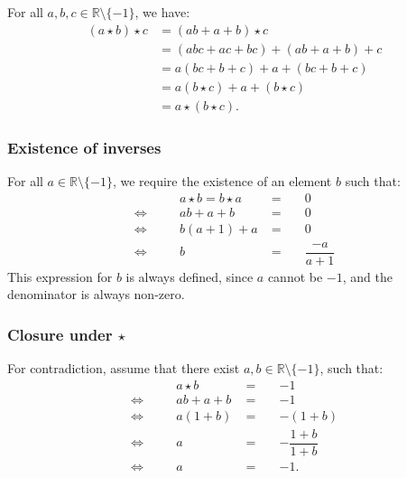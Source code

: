 \documentclass[11pt]{article}
\newcommand{\R}{\mathbb{R}}
\theoremstyle{definition}
\theoremstyle{plain}
\theoremstyle{remark}
\begin{document}
\begin{enumerate}
          For all $a, b, c \in \R \setminus \{-1\}$, we have:
          \[
              \begin{aligned}
                  (a \star b) \star c & = (ab + a + b) \star c               \\
                                      & = (abc + ac + bc) + (ab + a + b) + c \\
                                      & = a (bc + b + c) + a + (bc + b + c)  \\
                                      & = a (b \star c) + a + (b \star c)    \\
                                      & = a \star (b \star c).
              \end{aligned}
          \]

          \subsubsection*{Existence of inverses}

          For all $a \in \R \setminus \{-1\}$, we require the existence of an element $b$ such that:
          \[
              \begin{alignedat}{3}
                            &  & a \star b = b \star a & \; =\; &  & 0                 \\
                  \iff\quad &  & ab + a + b            & \; =\; &  & 0                 \\
                  \iff\quad &  & b(a + 1) + a          & \; =\; &  & 0                 \\
                  \iff\quad &  & b                     & \; =\; &  & \dfrac{-a}{a + 1}
              \end{alignedat}
          \]
          This expression for $b$ is always defined, since $a$ cannot be $-1$, and the denominator is always non-zero.

          \subsubsection*{Closure under $\star$}

          For contradiction, assume that there exist $a, b \in \R \setminus \{-1\}$, such that:
          \[
              \begin{alignedat}{3}
                            &  & a \star b  & \; = \; &  & -1                    \\
                  \iff\quad &  & ab + a + b & \; = \; &  & -1                    \\
                  \iff\quad &  & a (1 + b)  & \; = \; &  & - (1 + b)             \\
                  \iff\quad &  & a          & \; = \; &  & -\dfrac{1 + b}{1 + b} \\
                  \iff\quad &  & a          & \; = \; &  & -1.                   \\
              \end{alignedat}
          \]


\end{enumerate}
\end{document}
